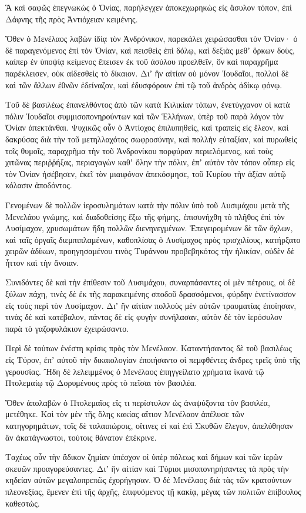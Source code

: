 {Ἃ καὶ σαφῶς ἐπεγνωκὼς ὁ Ὀνίας, παρήλεγχεν ἀποκεχωρηκὼς εἰς ἄσυλον τόπον, ἐπὶ Δάφνης τῆς πρὸς Ἀντιόχειαν κειμένης.
\par }{\PP {}Ὅθεν ὁ Μενέλαος λαβὼν ἰδίᾳ τὸν Ἀνδρόνικον, παρεκάλει χειρώσασθαι τὸν Ὀνίαν· ὁ δὲ παραγενόμενος ἐπὶ τὸν Ὀνίαν, καὶ πεισθεὶς ἐπὶ δόλῳ, καὶ δεξιὰς μεθʼ ὅρκων δοὺς, καίπερ ἐν ὑποψίᾳ κείμενος ἔπεισεν ἐκ τοῦ ἀσύλου προελθεῖν, ὃν καὶ παραχρῆμα παρέκλεισεν, οὐκ αἰδεσθεὶς τὸ δίκαιον.
Διʼ ἣν αἰτίαν οὐ μόνον Ἰουδαῖοι, πολλοὶ δὲ καὶ τῶν ἄλλων ἐθνῶν ἐδείναζον, καὶ ἐδυσφόρουν ἐπὶ τῷ τοῦ ἀνδρὸς ἀδίκῳ φόνῳ.
\par }{\PP {}Τοῦ δὲ βασιλέως ἐπανελθόντος ἀπὸ τῶν κατὰ Κιλικίαν τόπων, ἐνετύγχανον οἱ κατὰ πόλιν Ἰουδαῖοι συμμισοπονηρούντων καὶ τῶν Ἑλλήνων, ὑπὲρ τοῦ παρὰ λόγον τὸν Ὀνίαν ἀπεκτάνθαι.
Ψυχικῶς οὖν ὁ Ἀντίοχος ἐπιλυπηθεὶς, καὶ τραπεὶς εἰς ἔλεον, καὶ δακρύσας διὰ τὴν τοῦ μετηλλαχότος σωφροσύνην, καὶ πολλὴν εὐταξίαν,
καὶ πυρωθεὶς τοῖς θυμοῖς, παραχρῆμα τὴν τοῦ Ἀνδρονίκου πορφύραν περιελόμενος, καὶ τοὺς χιτῶνας περιῤῥήξας, περιαγαγὼν καθʼ ὅλην τὴν πόλιν, ἐπʼ αὐτὸν τὸν τόπον οὗπερ εἰς τὸν Ὀνίαν ἠσέβησεν, ἐκεῖ τὸν μιαιφόνον ἀπεκόσμησε, τοῦ Κυρίου τὴν ἀξίαν αὐτῷ κόλασιν ἀποδόντος.
\par }{\PP {}Γενομένων δὲ πολλῶν ἱεροσυλημάτων κατὰ τὴν πόλιν ὑπὸ τοῦ Λυσιμάχου μετὰ τῆς Μενελάου γνώμης, καὶ διαδοθείσης ἔξω τῆς φήμης, ἐπισυνήχθη τὸ πλῆθος ἐπὶ τὸν Λυσίμαχον, χρυσωμάτων ἤδη πολλῶν διενηνεγμένων.
Ἐπεγειρομένων δὲ τῶν ὄχλων, καὶ ταῖς ὀργαῖς διεμπιπλαμένων, καθοπλίσας ὁ Λυσίμαχος πρὸς τρισχιλίους, κατήρξατο χειρῶν ἀδίκων, προηγησαμένου τινὸς Τυράννου προβεβηκότος τὴν ἡλικίαν, οὐδὲν δὲ ἧττον καὶ τὴν ἄνοιαν.
\par }{\PP {}Συνιδόντες δὲ καὶ τὴν ἐπίθεσιν τοῦ Λυσιμάχου, συναρπάσαντες οἱ μὲν πέτρους, οἱ δὲ ξύλων πάχη, τινὲς δὲ ἐκ τῆς παρακειμένης σποδοῦ δρασσόμενοι, φύρδην ἐνετίνασσον εἰς τοὺς περὶ τὸν Λυσίμαχον.
Διʼ ἣν αἰτίαν πολλοὺς μὲν αὐτῶν τραυματίας ἐποίησαν, τινὰς δὲ καὶ κατέβαλον, πάντας δὲ εἰς φυγὴν συνήλασαν, αὐτὸν δὲ τὸν ἱερόσυλον παρὰ τὸ γαζοφυλάκιον ἐχειρώσαντο.
\par }{\PP {}Περὶ δὲ τούτων ἐνέστη κρίσις πρὸς τὸν Μενέλαον.
Καταντήσαντος δὲ τοῦ βασιλέως εἰς Τύρον, ἐπʼ αὐτοῦ τὴν δικαιολογίαν ἐποιήσαντο οἱ πεμφθέντες ἄνδρες τρεῖς ὑπὸ τῆς γερουσίας.
Ἤδη δὲ λελειμμένος ὁ Μενέλαος ἐπηγγείλατο χρήματα ἱκανὰ τῷ Πτολεμαίῳ τῷ Δορυμένους πρὸς τὸ πεῖσαι τὸν βασιλέα.
\par }{\PP {}Ὅθεν ἀπολαβὼν ὁ Πτολεμαῖος εἴς τι περίστυλον ὡς ἀναψύξοντα τὸν βασιλέα, μετέθηκε.
Καὶ τὸν μὲν τῆς ὅλης κακίας αἴτιον Μενέλαον ἀπέλυσε τῶν κατηγορημάτων, τοῖς δὲ ταλαιπώροις, οἵτινες εἰ καὶ ἐπὶ Σκυθῶν ἔλεγον, ἀπελύθησαν ἄν ἀκατάγνωστοι, τούτοις θάνατον ἐπέκρινε.
\par }{\PP {}Ταχέως οὖν τὴν ἄδικον ζημίαν ὑπέσχον οἱ ὑπὲρ πόλεως καὶ δήμων καὶ τῶν ἱερῶν σκευῶν προαγορεύσαντες.
Διʼ ἣν αἰτίαν καὶ Τύριοι μισοπονηρήσαντες τὰ πρὸς τὴν κηδείαν αὐτῶν μεγαλοπρεπῶς ἐχορήγησαν.
Ὁ δὲ Μενέλαος διὰ τὰς τῶν κρατούντων πλεονεξίας, ἔμενεν ἐπὶ τῆς ἀρχῆς, ἐπιφυόμενος τῇ κακίᾳ, μέγας τῶν πολιτῶν ἐπίβουλος καθεστώς.

}
